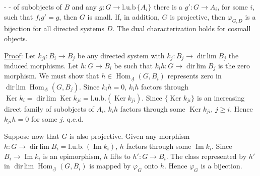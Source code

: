 -  -
of subobjects of $B$ and any $g:G\longrightarrow\mathrm{l.u.b}\,\{A_i\}$ there is a $g':G\longrightarrow A_i$, for some $i$, such that $f_i g'=g$, then $G$ is small. If, in addition, $G$ is projective, then $\varphi_{G,D}$ is a bijection for all directed systems $D$. The dual characterization holds for cosmall objects.

\uline{Proof}: Let $k_{ji}:B_i\longrightarrow B_j$ be any directed system with $k_j:B_j\longrightarrow\operatorname{dir\,lim}B_j$ the induced morphisms. Let $h:G\longrightarrow B_i$ be such that $k_i h:G\longrightarrow\operatorname{dir\,lim}B_j$ is the zero morphism. We must show that $h\in\operatorname{Hom}_{\underline A}(G,B_i)$ represents zero in $\operatorname{dir\,lim}\operatorname{Hom}_{\underline A}(G,B_j)$. Since $k_i h=0$, $k_i h$ factors through $\operatorname{Ker}k_i=\operatorname{dir\,lim}\operatorname{Ker}k_{ji}=\mathrm{l.u.b.}(\operatorname{Ker}k_{ji})$. Since $\{\operatorname{Ker}k_{ji}\}$ is an increasing direct family of subobjects of $A_i$, $k_i h$ factors through some $\operatorname{Ker}k_{ji}$, $j\geq i$. Hence $k_{ji}h=0$ for some $j$. q.e.d.

Suppose now that $G$ is also projective. Given any morphism $h:G\longrightarrow\operatorname{dir\,lim}B_i=\mathrm{l.u.b.}\,(\operatorname{Im}k_i)$, $h$ factors through some $\operatorname{Im}k_i$. Since $B_i\longrightarrow\operatorname{Im}k_i$ is an epimorphism, $h$ lifts to $h':G\longrightarrow B_i$. The class represented by $h'$ in $\operatorname{dir\,lim}\operatorname{Hom}_{\underline A}(G,B_i)$ is mapped by $\varphi_G$ onto $h$. Hence $\varphi_G$ is a bijection.

